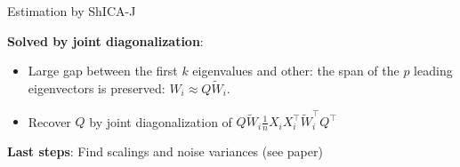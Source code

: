 \documentclass[final]{beamer}
\newlength{\onecolwid}
\newlength{\onecolwidtwo}
\begin{document}
\begin{frame}[t]
\begin{columns}[t]
\begin{column}{\onecolwidtwo}
\begin{block}{Estimation by ShICA-J}
    \vspace{0.5em}

    \textbf{Solved by joint diagonalization}:
    \begin{itemize}
    \item Large gap between the first $k$ eigenvalues and other: the span of the
      $p$ leading eigenvectors is preserved: 
      $W_i \approx Q \tilde{W}_i$.
    \item Recover $Q$ by joint diagonalization of $Q \tilde{W}_i \frac1{n}X_i X_i^{\top} \tilde{W}_i^{\top}Q^{\top}$
    \end{itemize}

    \vspace{0.5em}
    \textbf{Last steps}: Find scalings and noise variances (see paper)
  \end{block}


\end{column}
\end{columns}
\end{frame}
\end{document}
